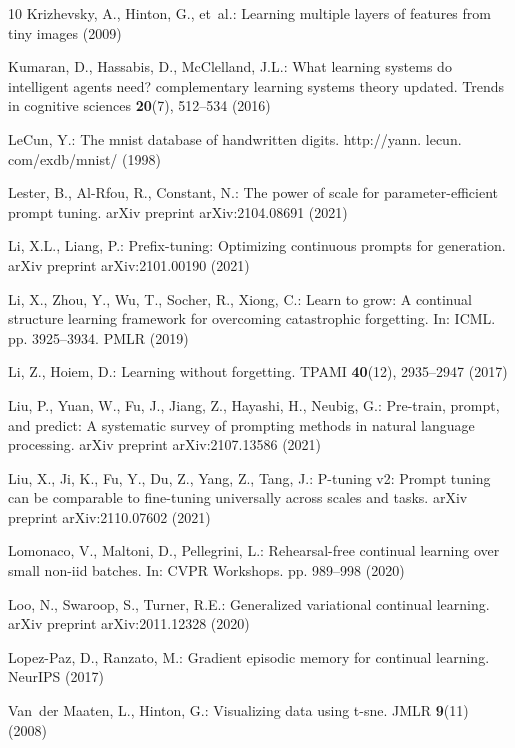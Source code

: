 \documentclass[runningheads]{llncs}
\begin{document}
\begin{thebibliography}{10}
Krizhevsky, A., Hinton, G., et~al.: Learning multiple layers of features from
  tiny images  (2009)

Kumaran, D., Hassabis, D., McClelland, J.L.: What learning systems do
  intelligent agents need? complementary learning systems theory updated.
  Trends in cognitive sciences  \textbf{20}(7),  512--534 (2016)

LeCun, Y.: The mnist database of handwritten digits. http://yann. lecun.
  com/exdb/mnist/  (1998)

Lester, B., Al-Rfou, R., Constant, N.: The power of scale for
  parameter-efficient prompt tuning. arXiv preprint arXiv:2104.08691  (2021)

Li, X.L., Liang, P.: Prefix-tuning: Optimizing continuous prompts for
  generation. arXiv preprint arXiv:2101.00190  (2021)

Li, X., Zhou, Y., Wu, T., Socher, R., Xiong, C.: Learn to grow: A continual
  structure learning framework for overcoming catastrophic forgetting. In:
  ICML. pp. 3925--3934. PMLR (2019)

Li, Z., Hoiem, D.: Learning without forgetting. TPAMI  \textbf{40}(12),
  2935--2947 (2017)

Liu, P., Yuan, W., Fu, J., Jiang, Z., Hayashi, H., Neubig, G.: Pre-train,
  prompt, and predict: A systematic survey of prompting methods in natural
  language processing. arXiv preprint arXiv:2107.13586  (2021)

Liu, X., Ji, K., Fu, Y., Du, Z., Yang, Z., Tang, J.: P-tuning v2: Prompt tuning
  can be comparable to fine-tuning universally across scales and tasks. arXiv
  preprint arXiv:2110.07602  (2021)

Lomonaco, V., Maltoni, D., Pellegrini, L.: Rehearsal-free continual learning
  over small non-iid batches. In: CVPR Workshops. pp. 989--998 (2020)

Loo, N., Swaroop, S., Turner, R.E.: Generalized variational continual learning.
  arXiv preprint arXiv:2011.12328  (2020)

Lopez-Paz, D., Ranzato, M.: Gradient episodic memory for continual learning.
  NeurIPS  (2017)

Van~der Maaten, L., Hinton, G.: Visualizing data using t-sne. JMLR
  \textbf{9}(11) (2008)


\end{thebibliography}
\end{document}
